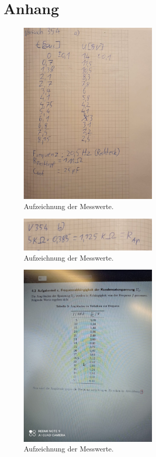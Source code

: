 \section{Anhang}

\begin{figure}
    \centering
    \includegraphics[width=0.6\textwidth]{images/Messwertea.jpg}
    \caption{Aufzeichnung der Messwerte.}
\end{figure}

\begin{figure}
    \centering
    \includegraphics[width=0.6\textwidth]{images/Messwertb.jpg}
    \caption{Aufzeichnung der Messwerte.}
\end{figure}

\begin{figure}
    \centering
    \includegraphics[width=0.6\textwidth]{images/Messwerte_c.jpeg}
    \caption{Aufzeichnung der Messwerte.}
\end{figure}

